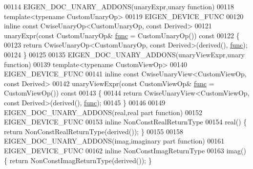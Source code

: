 \begin{DoxyCode}
00114 EIGEN\_DOC\_UNARY\_ADDONS(unaryExpr,unary \textcolor{keyword}{function})
00118 \textcolor{keyword}{template}<\textcolor{keyword}{typename} CustomUnaryOp>
00119 EIGEN\_DEVICE\_FUNC
00120 \textcolor{keyword}{inline} \textcolor{keyword}{const} CwiseUnaryOp<CustomUnaryOp, const Derived>
00121 unaryExpr(\textcolor{keyword}{const} CustomUnaryOp& \hyperlink{structfunc}{func} = CustomUnaryOp())\textcolor{keyword}{ const}
00122 \textcolor{keyword}{}\{
00123   \textcolor{keywordflow}{return} CwiseUnaryOp<CustomUnaryOp, const Derived>(derived(), \hyperlink{structfunc}{func});
00124 \}
00125 
00135 EIGEN\_DOC\_UNARY\_ADDONS(unaryViewExpr,unary \textcolor{keyword}{function})
00139 \textcolor{keyword}{template}<\textcolor{keyword}{typename} CustomViewOp>
00140 EIGEN\_DEVICE\_FUNC
00141 \textcolor{keyword}{inline} \textcolor{keyword}{const} CwiseUnaryView<CustomViewOp, const Derived>
00142 unaryViewExpr(\textcolor{keyword}{const} CustomViewOp& \hyperlink{structfunc}{func} = CustomViewOp())\textcolor{keyword}{ const}
00143 \textcolor{keyword}{}\{
00144   \textcolor{keywordflow}{return} CwiseUnaryView<CustomViewOp, const Derived>(derived(), \hyperlink{structfunc}{func});
00145 \}
00146 
00149 EIGEN\_DOC\_UNARY\_ADDONS(real,real part \textcolor{keyword}{function})
00152 EIGEN\_DEVICE\_FUNC
00153 \textcolor{keyword}{inline} NonConstRealReturnType
00154 real() \{ \textcolor{keywordflow}{return} NonConstRealReturnType(derived()); \}
00155 
00158 EIGEN\_DOC\_UNARY\_ADDONS(imag,imaginary part \textcolor{keyword}{function})
00161 EIGEN\_DEVICE\_FUNC
00162 \textcolor{keyword}{inline} NonConstImagReturnType
00163 imag() \{ \textcolor{keywordflow}{return} NonConstImagReturnType(derived()); \}
\end{DoxyCode}
